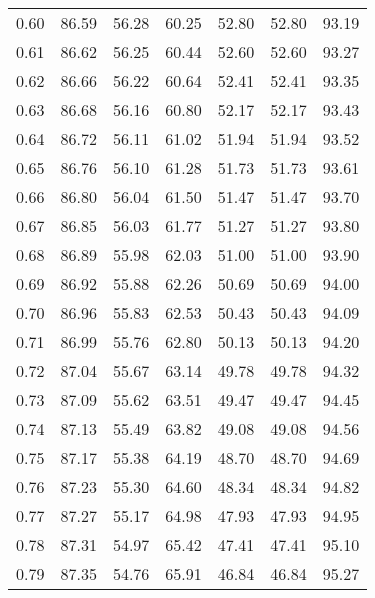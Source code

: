 \begin{tabular}{|c|c|c|c|c|c|c|}
      0.60 &     86.59 &     56.28 &      60.25 &   52.80 &      52.80 &         93.19 \\
      0.61 &     86.62 &     56.25 &      60.44 &   52.60 &      52.60 &         93.27 \\
      0.62 &     86.66 &     56.22 &      60.64 &   52.41 &      52.41 &         93.35 \\
      0.63 &     86.68 &     56.16 &      60.80 &   52.17 &      52.17 &         93.43 \\
      0.64 &     86.72 &     56.11 &      61.02 &   51.94 &      51.94 &         93.52 \\
      0.65 &     86.76 &     56.10 &      61.28 &   51.73 &      51.73 &         93.61 \\
      0.66 &     86.80 &     56.04 &      61.50 &   51.47 &      51.47 &         93.70 \\
      0.67 &     86.85 &     56.03 &      61.77 &   51.27 &      51.27 &         93.80 \\
      0.68 &     86.89 &     55.98 &      62.03 &   51.00 &      51.00 &         93.90 \\
      0.69 &     86.92 &     55.88 &      62.26 &   50.69 &      50.69 &         94.00 \\
      0.70 &     86.96 &     55.83 &      62.53 &   50.43 &      50.43 &         94.09 \\
      0.71 &     86.99 &     55.76 &      62.80 &   50.13 &      50.13 &         94.20 \\
      0.72 &     87.04 &     55.67 &      63.14 &   49.78 &      49.78 &         94.32 \\
      0.73 &     87.09 &     55.62 &      63.51 &   49.47 &      49.47 &         94.45 \\
      0.74 &     87.13 &     55.49 &      63.82 &   49.08 &      49.08 &         94.56 \\
      0.75 &     87.17 &     55.38 &      64.19 &   48.70 &      48.70 &         94.69 \\
      0.76 &     87.23 &     55.30 &      64.60 &   48.34 &      48.34 &         94.82 \\
      0.77 &     87.27 &     55.17 &      64.98 &   47.93 &      47.93 &         94.95 \\
      0.78 &     87.31 &     54.97 &      65.42 &   47.41 &      47.41 &         95.10 \\
      0.79 &     87.35 &     54.76 &      65.91 &   46.84 &      46.84 &         95.27 \\

\end{tabular}
